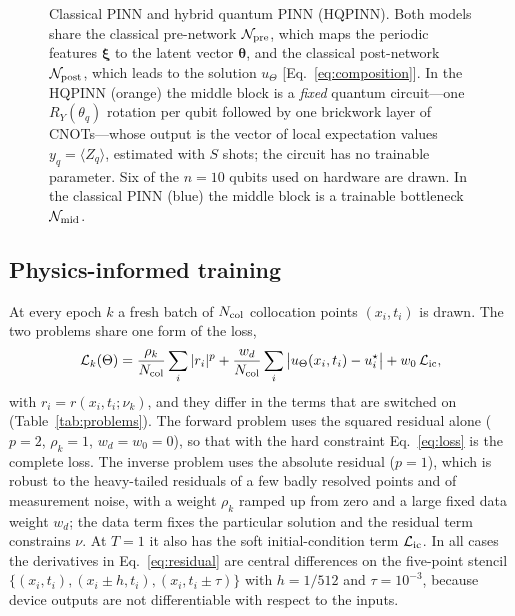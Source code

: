 \documentclass[floatfix,aps,pra,twocolumn,superscriptaddress,10pt,nofootinbib]{revtex4-2}
\newcommand{\Ncol}{N_{\rm col}}
\begin{document}
\begin{figure}[t]
  \centering
  \resizebox{\textwidth}{!}{}
  \caption{\justifying
  Classical PINN and hybrid quantum PINN (HQPINN). Both models share the classical pre-network $\mathcal N_{\rm pre}$, which maps the periodic features $\bm\xi$ to the latent vector $\bm\theta$, and the classical post-network $\mathcal N_{\rm post}$, which leads to the solution $u_\Theta$ [Eq.~\eqref{eq:composition}]. In the HQPINN (orange) the middle block is a \emph{fixed} quantum circuit---one $R_Y(\theta_q)$ rotation per qubit followed by one brickwork layer of CNOTs---whose output is the vector of local expectation values $y_q=\langle Z_q\rangle$, estimated with $S$ shots; the circuit has no trainable parameter. Six of the $n=10$ qubits used on hardware are drawn. In the classical PINN (blue) the middle block is a trainable bottleneck $\mathcal N_{\rm mid}$.}
  \label{fig:schematic}
\end{figure}

\subsection{Physics-informed training}\label{sec:loss}
At every epoch $k$ a fresh batch of $\Ncol$ collocation points $(x_i,t_i)$ is drawn. The two problems share one form of the loss,
\begin{equation}
  \mathcal L_k(\Theta)=\frac{\rho_k}{\Ncol}\sum_{i} |r_i|^p+\frac{w_d}{\Ncol}\sum_{i}\big|u_\Theta(x_i,t_i)-u^\star_i\big|+w_0\,\mathcal L_{\rm ic},
  \label{eq:loss}
\end{equation}
with $r_i=r(x_i,t_i;\nu_k)$, and they differ in the terms that are switched on (Table~\ref{tab:problems}). The forward problem uses the squared residual alone ($p=2$, $\rho_k=1$, $w_d=w_0=0$), so that with the hard constraint Eq.~\eqref{eq:loss} is the complete loss. The inverse problem uses the absolute residual ($p=1$), which is robust to the heavy-tailed residuals of a few badly resolved points and of measurement noise, with a weight $\rho_k$ ramped up from zero and a large fixed data weight $w_d$; the data term fixes the particular solution and the residual term constrains $\nu$. At $T=1$ it also has the soft initial-condition term $\mathcal L_{\rm ic}$. In all cases the derivatives in Eq.~\eqref{eq:residual} are central differences on the five-point stencil $\{(x_i,t_i),(x_i\pm h,t_i),(x_i,t_i\pm\tau)\}$ with $h=1/512$ and $\tau=10^{-3}$, because device outputs are not differentiable with respect to the inputs.
\end{document}
